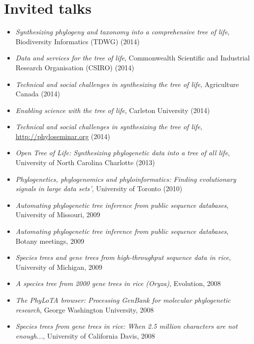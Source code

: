 \documentclass[10pt]{article}
\begin{document}
\section*{Invited talks}
\begin{itemize}
\item{\textit{Synthesizing phylogeny and taxonomy into a comprehensive tree of life}, Biodiversity Informatics (TDWG) (2014)}
\item{\textit{Data and services for the tree of life}, Commonwealth Scientific and Industrial Research Organisation (CSIRO) (2014)}
\item{\textit{Technical and social challenges in synthesizing the tree of life}, Agriculture Canada (2014)}
\item{\textit{Enabling science with the tree of life}, Carleton University (2014)}
\item{\textit{Technical and social challenges in synthesizing the tree of life}, \url{http://phyloseminar.org} (2014)}
\item{\textit{Open Tree of Life: Synthesizing phylogenetic data into a tree of all life}, University of North Carolina Charlotte (2013)}
\item{\textit{Phylogenetics, phylogenomics and phyloinformatics: Finding evolutionary signals in large data sets'}, University of Toronto (2010)}
\item{\textit{Automating phylogenetic tree inference from public sequence databases}, University of Missouri, 2009} 
\item{\textit{Automating phylogenetic tree inference from public sequence databases}, Botany meetings, 2009} 
\item{\textit{Species trees and gene trees from high-throughput sequence data in rice}, University of Michigan, 2009}
\item{\textit{A species tree from 2000 gene trees in rice (Oryza)}, Evolution, 2008}
\item{\textit{The PhyLoTA browser: Processing GenBank for molecular phylogenetic research}, George Washington University, 2008}
\item{\textit{Species trees from gene trees in rice: When 2.5 million characters are not enough...}, University of California Davis, 2008}
\end{itemize}

\end{document}
